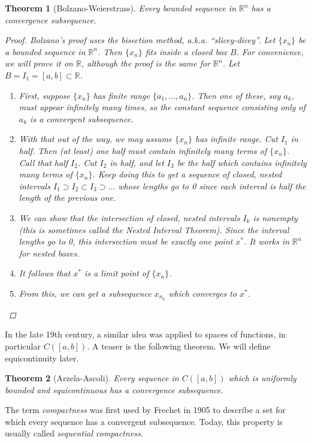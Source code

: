 \documentclass[10pt]{article}         %
\newtheorem{theorem}{Theorem}[section]
\theoremstyle{remark}
\newcommand{\R}{\mathbb{R}}
\begin{document}
\begin{theorem}[Bolzano-Weierstrass]Every bounded sequence in $\R^n$ has a convergence subsequence.
\begin{proof}
Bolzano's proof uses the bisection method, a.k.a. ``slicey-dicey''. Let $\{ x_n \}$ be a bounded sequence in $\R^n$. Then $\{ x_n \}$ fits inside a closed box $B$. For convenience, we will prove it on $\R$, although the proof is the same for $\R^n$. Let $B = I_1 = [a,b] \subset \R$.
\begin{enumerate}
    \item First, suppose $\{ x_n \}$ has finite range $\{a_1, \dots, a_n \}$. Then one of these, say $a_k$, must appear infinitely many times, so the constant sequence consisting only of $a_k$ is a convergent subsequence.
    \item With that out of the way, we may assume $\{ x_n \}$ has infinite range. Cut $I_1$ in half. Then (at least) one half must contain infinitely many terms of $\{ x_n \}$. Call that half $I_2$. Cut $I_2$ in half, and let $I_3$ be the half which contains infinitely many terms of $\{ x_n \}$. Keep doing this to get a sequence of closed, nested intervals $I_1 \supset I_2 \subset I_3 \supset \dots$ whose lengths go to 0 since each interval is half the length of the previous one.
    \item We can show that the intersection of closed, nested intervals $I_k$ is nonempty (this is sometimes called the Nested Interval Theorem). Since the interval lengths go to 0, this intersection must be exactly one point $x^*$. It works in $\R^n$ for nested boxes.
    \item It follows that $x^*$ is a limit point of $\{ x_n \}$.
    \item From this, we can get a subsequence $x_{n_k}$ which converges to $x^*$.
\end{enumerate}
\end{proof}
\end{theorem}

In the late 19th century, a similar idea was applied to spaces of functions, in particular $C([a,b])$. A teaser is the following theorem. We will define equicontinuity later.

\begin{theorem}[Arzela-Ascoli]Every sequence in $C([a,b])$ which is uniformly bounded and equicontinuous has a convergence subsequence.
\end{theorem}

The term \emph{compactness} was first used by Frechet in 1905 to describe a set for which every sequence has a convergent subsequence. Today, this property is usually called \emph{sequential compactness}.
\end{document}
